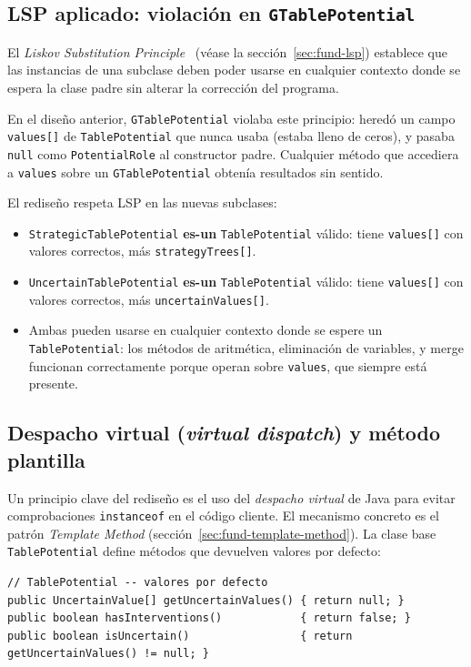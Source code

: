 \documentclass[11pt,a4paper]{article}
\newcommand{\code}[1]{\texttt{#1}}
\begin{document}
\subsection{LSP aplicado: violación en \texttt{GTablePotential}}

El \emph{Liskov Substitution Principle}~\cite{liskov1994}
(véase la sección~\ref{sec:fund-lsp}) establece que las
instancias de una subclase deben poder usarse en cualquier contexto donde se espera
la clase padre sin alterar la corrección del programa.

En el diseño anterior, \code{GTablePotential} violaba este principio: heredó un
campo \code{values[]} de \code{TablePotential} que nunca usaba (estaba lleno de
ceros), y pasaba \code{null} como \code{PotentialRole} al constructor padre.
Cualquier método que accediera a \code{values} sobre un \code{GTablePotential}
obtenía resultados sin sentido.

El rediseño respeta LSP en las nuevas subclases:

\begin{itemize}
  \item \code{StrategicTablePotential} \textbf{es-un} \code{TablePotential} válido:
        tiene \code{values[]} con valores correctos, más \code{strategyTrees[]}.
  \item \code{UncertainTablePotential} \textbf{es-un} \code{TablePotential} válido:
        tiene \code{values[]} con valores correctos, más \code{uncertainValues[]}.
  \item Ambas pueden usarse en cualquier contexto donde se espere un
        \code{TablePotential}: los métodos de aritmética, eliminación de
        variables, y merge funcionan correctamente porque operan sobre \code{values},
        que siempre está presente.
\end{itemize}

\subsection{Despacho virtual (\emph{virtual dispatch}) y método plantilla}

Un principio clave del rediseño es el uso del \emph{despacho virtual} de Java para
evitar comprobaciones \code{instanceof} en el código cliente.  El mecanismo
concreto es el patrón \emph{Template Method} (sección~\ref{sec:fund-template-method}).  La clase base
\code{TablePotential} define métodos que devuelven valores por defecto:

\begin{lstlisting}[caption={Métodos con despacho virtual en \code{TablePotential}}]
// TablePotential -- valores por defecto
public UncertainValue[] getUncertainValues() { return null; }
public boolean hasInterventions()            { return false; }
public boolean isUncertain()                 { return getUncertainValues() != null; }
\end{lstlisting}
\end{document}
